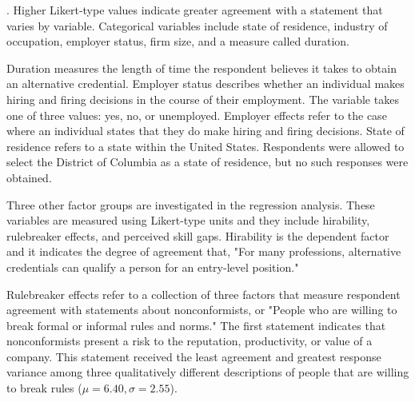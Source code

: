 \documentclass[review]{elsarticle}
\begin{document}
{    %
}.
Higher Likert-type values indicate greater agreement with a statement that varies by variable.
Categorical variables include state of residence,
industry of occupation,
employer status,
firm size,
and a measure called duration.

Duration measures the length of time the respondent believes it takes to obtain an alternative credential.
Employer status describes whether an individual makes hiring and firing decisions in the course of their employment.
The variable takes one of three values: yes, no, or unemployed.
Employer effects refer to the case where an individual states that they do make hiring and firing decisions.
State of residence refers to a state within the United States.
Respondents were allowed to select the District of Columbia as a state of residence,
but no such responses were obtained.

Three other factor groups are investigated in the regression analysis.
These variables are measured using Likert-type units and they include hirability,
rulebreaker effects,
and perceived skill gaps.
Hirability is the dependent factor and it indicates the degree of agreement that, "For many professions, alternative credentials can qualify a person for an entry-level position."

Rulebreaker effects refer to a collection of three factors that measure respondent agreement with statements about nonconformists, or "People who are willing to break formal or informal rules and norms."
The first statement indicates that nonconformists present a risk to the reputation, productivity, or value of a company.
This statement received the least agreement and greatest response variance among three qualitatively different descriptions of people that are willing to break rules ($\mu = 6.40, \sigma = 2.55$).
\end{document}
